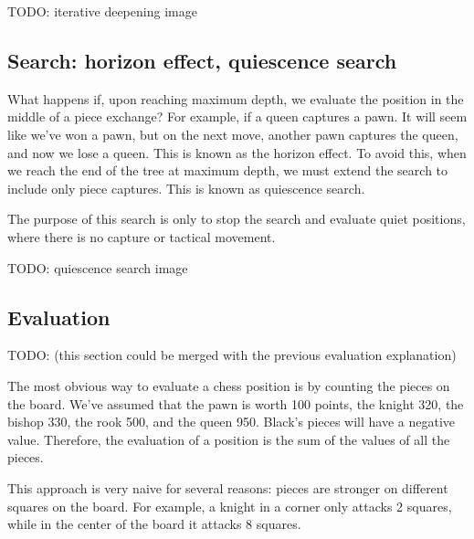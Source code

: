 \vspace{1em}

TODO: iterative deepening image

\subsection{Search: horizon effect, quiescence search}

What happens if, upon reaching maximum depth, we evaluate the position in the middle of a piece exchange? For example, if a queen captures a pawn. It will seem like we've won a pawn, but on the next move, another pawn captures the queen, and now we lose a queen. This is known as the horizon effect. To avoid this, when we reach the end of the tree at maximum depth, we must extend the search to include only piece captures. This is known as quiescence search.

\vspace{1em}

\noindent The purpose of this search is only to stop the search and evaluate quiet positions, where there is no capture or tactical movement.

\vspace{1em}

TODO: quiescence search image

\subsection{Evaluation}

TODO: (this section could be merged with the previous evaluation explanation)

\vspace{1em}

\noindent The most obvious way to evaluate a chess position is by counting the pieces on the board. We've assumed that the pawn is worth 100 points, the knight 320, the bishop 330, the rook 500, and the queen 950. Black's pieces will have a negative value. Therefore, the evaluation of a position is the sum of the values of all the pieces.

\vspace{1em}

\noindent This approach is very naive for several reasons: pieces are stronger on different squares on the board. For example, a knight in a corner only attacks 2 squares, while in the center of the board it attacks 8 squares.

\vspace{1em}

